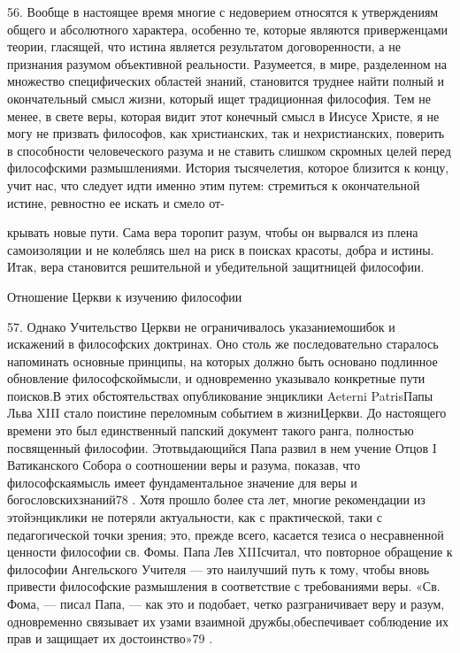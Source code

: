 \documentclass[a5paper,10pt]{article}
\begin{document}
56. Вообще в настоящее время многие с недоверием относятся к утверждениям
общего и абсолютного характера, особенно те, которые являются приверженцами
теории, гласящей, что истина является результатом договоренности, а не
признания разумом объективной реальности. Разумеется, в мире, разделенном на
множество специфических областей знаний, становится труднее найти полный и
окончательный смысл жизни, который ищет традиционная философия. Тем не менее, в
свете веры, которая видит этот конечный смысл в Иисусе Христе, я не могу не
призвать философов, как христианских, так и нехристианских, поверить в
способности человеческого разума и не ставить слишком скромных целей перед
философскими размышлениями. История тысячелетия, которое близится к концу, учит
нас, что следует идти именно этим путем: стремиться к окончательной истине,
ревностно ее искать и смело от-

крывать новые пути. Сама вера торопит разум, чтобы он вырвался из плена
самоизоляции и не колеблясь шел на риск в поисках красоты, добра и истины.
Итак, вера становится решительной и убедительной защитницей философии.

Отношение Церкви к изучению философии

57. Однако Учительство Церкви не ограничивалось указаниемошибок и искажений в
философских доктринах. Оно столь же последовательно старалось напоминать
основные принципы, на которых должно быть основано подлинное обновление
философскоймысли, и одновременно указывало конкретные пути поисков.В этих
обстоятельствах опубликование энциклики Aeterni PatrisПапы Льва XIII стало
поистине переломным событием в жизниЦеркви. До настоящего времени это был
единственный папский документ такого ранга, полностью посвященный философии.
Этотвыдающийся Папа развил в нем учение Отцов I Ватиканского Собора о
соотношении веры и разума, показав, что философскаямысль имеет фундаментальное
значение для веры и богословскихзнаний78 . Хотя прошло более ста лет, многие
рекомендации из этойэнциклики не потеряли актуальности, как с практической,
таки с педагогической точки зрения; это, прежде всего, касается тезиса о
несравненной ценности философии св. Фомы. Папа Лев XIIIсчитал, что повторное
обращение к философии Ангельского Учителя — это наилучший путь к тому, чтобы
вновь привести философские размышления в соответствие с требованиями веры. «Св.
Фома, — писал Папа, — как это и подобает, четко разграничивает веру и разум,
одновременно связывает их узами взаимной дружбы,обеспечивает соблюдение их прав
и защищает их достоинство»79 .
\end{document}

